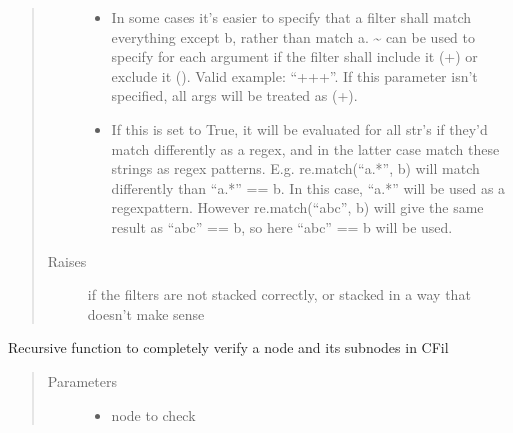 \documentclass[a4paper,10pt,english]{sphinxmanual}
\begin{document}
\begin{fulllineitems}
\begin{fulllineitems}
\begin{quote}
\begin{description}
\begin{itemize}
\item {}
\sphinxAtStartPar
{} \textendash{} In some cases it’s easier to specify that a filter shall match everything except b, rather than
match a. \textasciitilde{} can be used to specify for each argument if the filter shall include it (+) or exclude it
(\sphinxhyphen{}). Valid example: “++\sphinxhyphen{}+”. If this parameter isn’t specified, all args will be treated as (+).

\item {}
\sphinxAtStartPar
{} \textendash{} If this is set to True, it will be evaluated for all str’s if they’d match differently as a
regex, and in the latter case match these strings as regex patterns. E.g. re.match(“a.*”, b) will match
differently than “a.*” == b. In this case, “a.*” will be used as a regex\sphinxhyphen{}pattern. However
re.match(“abc”, b) will give the same result as “abc” == b, so here “abc” == b will be used.

\end{itemize}

\item[{Raises}] \leavevmode
\sphinxAtStartPar
{} \textendash{} if the filters are not stacked correctly, or stacked in a way that doesn’t make sense

\end{description}\end{quote}

\end{fulllineitems}


\begin{fulllineitems}
\label{\detokenize{fagus.filters:fagus.filters.CFil.match_node}}
\pysigstartsignatures
{}
\pysigstopsignatures
\sphinxAtStartPar
Recursive function to completely verify a node and its subnodes in CFil
\begin{quote}\begin{description}
\item[{Parameters}] \leavevmode\begin{itemize}
\item {}
\sphinxAtStartPar
{} \textendash{} node to check


\end{itemize}
\end{description}
\end{quote}
\end{fulllineitems}
\end{fulllineitems}
\end{document}
